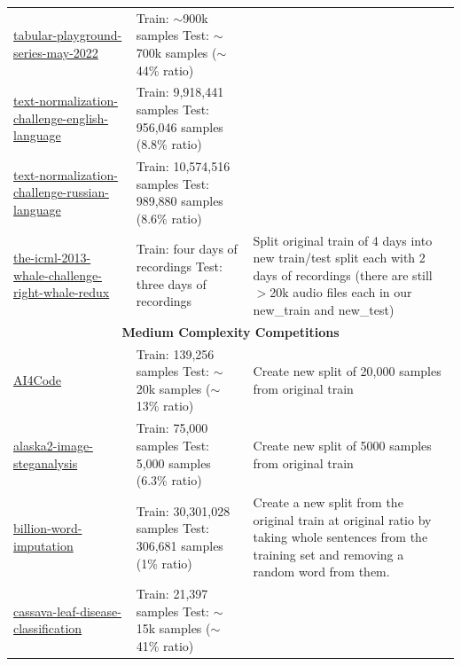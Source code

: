 \documentclass{article} %
\begin{document}
\begin{longtable}{m{4cm} m{4.5cm} m{4cm}}
    \href{https://www.kaggle.com/c/tabular-playground-series-may-2022}{tabular-playground-series-may-2022} &  Train: $\sim$900k samples \newline  Test: $\sim$700k samples ($\sim$44\% ratio) & \\
    \href{https://www.kaggle.com/c/text-normalization-challenge-english-language}{text-normalization-challenge-english-language} &  Train: 9,918,441 samples \newline  Test: 956,046 samples (8.8\% ratio) & \\
    \href{https://www.kaggle.com/c/text-normalization-challenge-russian-language}{text-normalization-challenge-russian-language} &  Train: 10,574,516 samples \newline  Test: 989,880 samples (8.6\% ratio) & \\
    \href{https://www.kaggle.com/c/the-icml-2013-whale-challenge-right-whale-redux}{the-icml-2013-whale-challenge-right-whale-redux} &  Train: four days of recordings \newline  Test: three days of recordings & Split original train of 4 days into new train/test split each with 2 days of recordings (there are still $>$20k audio files each in our new\_train and new\_test)\\
    \midrule
    \multicolumn{3}{c}{\textbf{Medium Complexity Competitions}} \\
    \midrule
    \href{https://www.kaggle.com/c/AI4Code}{AI4Code} &  Train: 139,256 samples \newline  Test: $\sim$20k samples ($\sim$13\% ratio) & Create new split of 20,000 samples from original train \\
    \href{https://www.kaggle.com/c/alaska2-image-steganalysis}{alaska2-image-steganalysis} &  Train: 75,000 samples \newline  Test: 5,000 samples (6.3\% ratio) & Create new split of 5000 samples from original train \\
    \href{https://www.kaggle.com/c/billion-word-imputation}{billion-word-imputation} &  Train: 30,301,028 samples \newline  Test: 306,681 samples (1\% ratio) & Create a new split from the original train at original ratio by taking whole sentences from the training set and removing a random word from them. \\
    \href{https://www.kaggle.com/c/cassava-leaf-disease-classification}{cassava-leaf-disease-classification} &  Train: 21,397 samples \newline  Test: $\sim$15k samples ($\sim$41\% ratio) & \\

\end{longtable}
\end{document}
